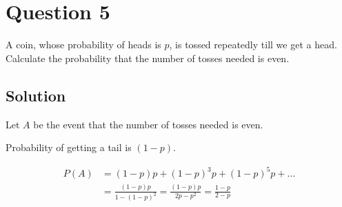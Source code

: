 \section*{Question 5}

A coin, whose probability of heads is \( p \), is tossed repeatedly till we get a head.
Calculate the probability that the number of tosses needed is even.

\subsection*{Solution}

Let \( A \) be the event that the number of tosses needed is even.

Probability of getting a tail is \( (1 - p) \).

\begin{align*}
    P(A)
     & =
    (1 - p)p + {(1 - p)}^3p + {(1 - p)}^5p + \ldots
    \\ & =
    \frac{(1 - p)p}{1 - {(1 - p)}^2}
    =
    \frac{(1 - p)p}{2p - p^2}
    =
    \boxed{
        \frac{1 - p}{2 - p}
    }
\end{align*}
